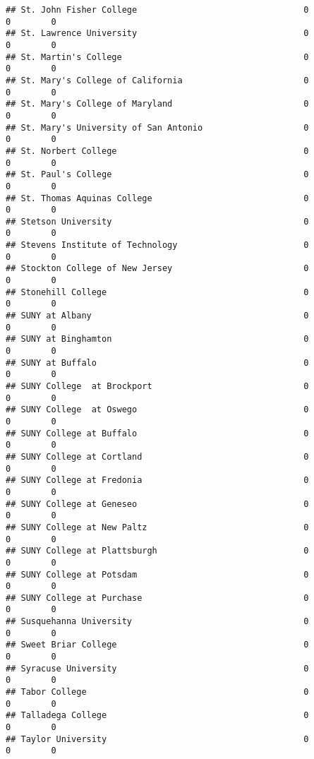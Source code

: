 \documentclass[
]{article}
\begin{document}
\begin{verbatim}
## St. John Fisher College                                 0           0        0
## St. Lawrence University                                 0           0        0
## St. Martin's College                                    0           0        0
## St. Mary's College of California                        0           0        0
## St. Mary's College of Maryland                          0           0        0
## St. Mary's University of San Antonio                    0           0        0
## St. Norbert College                                     0           0        0
## St. Paul's College                                      0           0        0
## St. Thomas Aquinas College                              0           0        0
## Stetson University                                      0           0        0
## Stevens Institute of Technology                         0           0        0
## Stockton College of New Jersey                          0           0        0
## Stonehill College                                       0           0        0
## SUNY at Albany                                          0           0        0
## SUNY at Binghamton                                      0           0        0
## SUNY at Buffalo                                         0           0        0
## SUNY College  at Brockport                              0           0        0
## SUNY College  at Oswego                                 0           0        0
## SUNY College at Buffalo                                 0           0        0
## SUNY College at Cortland                                0           0        0
## SUNY College at Fredonia                                0           0        0
## SUNY College at Geneseo                                 0           0        0
## SUNY College at New Paltz                               0           0        0
## SUNY College at Plattsburgh                             0           0        0
## SUNY College at Potsdam                                 0           0        0
## SUNY College at Purchase                                0           0        0
## Susquehanna University                                  0           0        0
## Sweet Briar College                                     0           0        0
## Syracuse University                                     0           0        0
## Tabor College                                           0           0        0
## Talladega College                                       0           0        0
## Taylor University                                       0           0        0

\end{verbatim}
\end{document}
